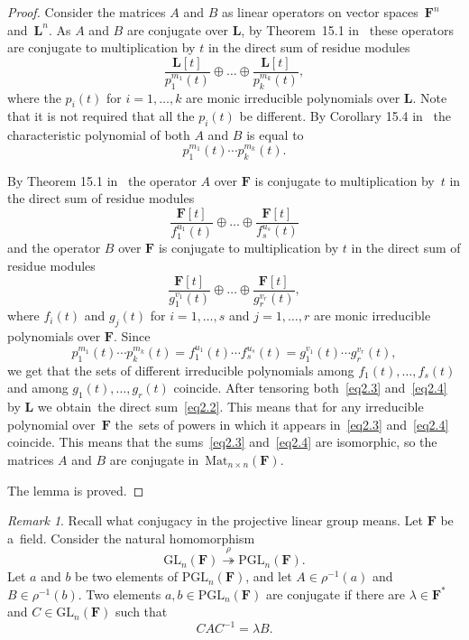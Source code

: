 \documentclass{amsart}
\numberwithin{equation}{section}
\theoremstyle{plain}
\theoremstyle{definition}
\theoremstyle{remark}
\newtheorem{remark}{Remark}
\begin{document}
\begin{proof}
Consider the matrices $A$ and $B$ as linear operators on vector spaces~$\mathbf{F}^n$ and~$\mathbf{L}^n$. As $A$ and $B$ are conjugate over $\mathbf{L}$, by Theorem~15.1 in~\cite{10} these operators are conjugate to multiplication by $t$ in the direct sum of residue modules
\begin{equation}
\label{eq2.2}
\frac{\mathbf{L}[t]}{p_1^{m_1}(t)} \oplus \dots \oplus \frac{\mathbf{L}[t]}{p_k^{m_k}(t)},
\end{equation}
where the $p_i(t)$ for $i=1, \dots, k$ are monic irreducible polynomials over
$\mathbf{L}$. Note that it is not required that all the $p_i(t)$ be different. By Corollary 15.4 in~\cite{10} the characteristic polynomial of both $A$ and $B$ is equal to
$$
p_1^{m_1}(t) \dotsb p_k^{m_k}(t).
$$

By Theorem 15.1 in~\cite{10} the operator $A$ over $\mathbf{F}$ is conjugate to multiplication by~$t$ in the direct sum of residue modules
\begin{equation}
\label{eq2.3}
\frac{\mathbf{F}[t]}{f_1^{u_1}(t)} \oplus \dots \oplus \frac{\mathbf{F}[t]}{f_s^{u_s}(t)}
\end{equation}
and the operator $B$ over $\mathbf{F}$ is conjugate to multiplication by $t$ in the direct sum of residue modules
\begin{equation}
\label{eq2.4}
\frac{\mathbf{F}[t]}{g_1^{v_1}(t)} \oplus \dots \oplus \frac{\mathbf{F}[t]}{g_r^{v_r}(t)},
\end{equation}
where $f_i(t)$ and $g_j(t)$ for $i=1, \dots, s$ and $j=1, \dots, r$ are monic irreducible polynomials over $\mathbf{F}$. Since
$$
p_1^{m_1}(t) \dotsb p_k^{m_k}(t)=f_1^{u_1}(t) \dotsb f_s^{u_s}(t) = g_1^{v_1}(t) \dotsb g_r^{v_r}(t),
$$
we get that the sets of different irreducible polynomials among $f_1(t), \dots, f_s(t)$ and among $g_1(t), \dots, g_r(t)$ coincide.
After tensoring both~\eqref{eq2.3} and~\eqref{eq2.4} by $\mathbf{L}$ we obtain~the direct sum~\eqref{eq2.2}. This means that for any irreducible polynomial over~$\mathbf{F}$ the~sets of powers
in which it appears in~\eqref{eq2.3} and~\eqref{eq2.4} coincide. This means that the sums~\eqref{eq2.3} and~\eqref{eq2.4} are isomorphic, so the matrices $A$ and $B$ are conjugate in~$\mathrm{Mat}_{n \times n}(\mathbf{F})$.

The lemma is proved.
\end{proof}

\begin{remark}
\label{r2}
Recall what conjugacy in the projective linear group means. Let $\mathbf{F}$ be a~field. Consider the natural homomorphism
$$
\mathrm{GL}_n(\mathbf{F}) \stackrel{\rho}{\twoheadrightarrow} \mathrm{PGL}_n(\mathbf{F}).
$$
Let $a$ and $b$ be two elements of $\mathrm{PGL}_n(\mathbf{F})$, and let $A \in \rho^{-1}(a)$ and $B \in \rho^{-1}(b)$. Two elements $a,b \in \mathrm{PGL}_n(\mathbf{F})$ are conjugate if there are $\lambda \in \mathbf{F}^*$ and $C \in \mathrm{GL}_n(\mathbf{F})$ such that
$$
 CAC^{-1}=\lambda B.
$$
\end{remark}
\end{document}
